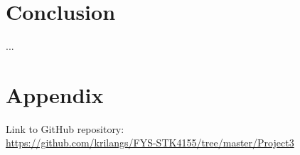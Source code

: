 \documentclass[12pt,a4paper,english]{article}
\begin{document}
\section{Conclusion}
\label{sect:Conclusion}
...
\appendix
\section{Appendix}
\label{sect:Appendix}
Link to GitHub repository:\\
\url{https://github.com/krilangs/FYS-STK4155/tree/master/Project3}



\end{document}
